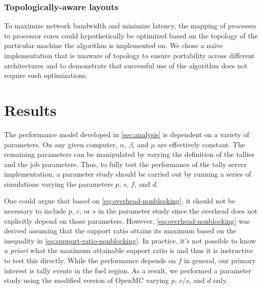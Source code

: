 \documentclass[3p,fleqn]{elsarticle}
\begin{document}
\subsubsection{Topologically-aware layouts}

To maximize network bandwidth and minimize latency, the mapping of processes to
processor cores could hypothetically be optimized based on the topology of the
particular machine the algorithm is implemented on. We chose a naïve
implementation that is unaware of topology to ensure portability across
different architectures and to demonstrate that successful use of the algorithm
does not require such optimizations.

\section{Results}
\label{sec:results}

The performance model developed in \autoref{sec:analysis} is dependent on a
variety of parameters. On any given computer, $\alpha$, $\beta$, and $\mu$ are
effectively constant. The remaining parameters can be manipulated by varying the
definition of the tallies and the job parameters. Thus, to fully test the
performance of the tally server implementation, a parameter study should be
carried out by running a series of simulations varying the parameters $p$, $s$,
$f$, and $d$.

One could argue that based on \eqref{eq:overhead-nonblocking}, it should not be
necessary to include $p$, $c$, or $s$ in the parameter study since the overhead
does not explicitly depend on those parameters. However,
\eqref{eq:overhead-nonblocking} was derived assuming that the support ratio
attains its maximum based on the inequality in
\eqref{eq:support-ratio-nonblocking}. In practice, it's not possible to know
\emph{a priori} what the maximum attainable support ratio is and thus it is
instructive to test this directly. While the performance depends on $f$ in
general, our primary interest is tally events in the fuel region. As a result,
we performed a parameter study using the modified version of OpenMC varying $p$,
$c/s$, and $d$ only.
\end{document}
